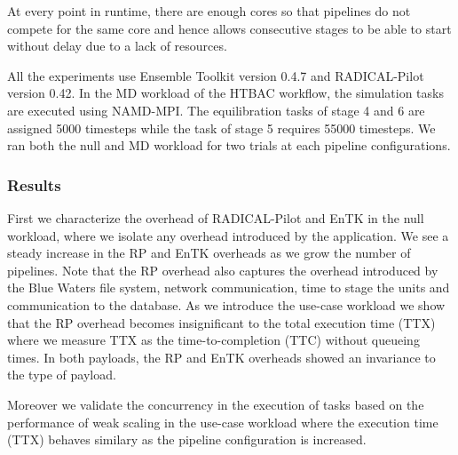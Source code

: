 At every point in runtime, there are enough cores so that pipelines do not compete for the same core and hence allows consecutive stages to be able to start without delay due to a lack of resources. 



All the experiments use Ensemble Toolkit version 0.4.7 and RADICAL-Pilot
version 0.42. In the MD workload of the HTBAC workflow, the simulation tasks
are executed using NAMD-MPI\@. The equilibration %
tasks of stage 4 and 6 are assigned 5000 timesteps while the task of stage 5
requires 55000 timesteps. We ran both the null and MD workload for two trials at each pipeline configurations. 

\subsubsection{Results}

First we characterize the overhead of RADICAL-Pilot and EnTK in the null workload, where we isolate any overhead introduced by the application. We see a steady increase in the RP and EnTK overheads as we grow the number of pipelines. Note that the RP overhead also captures the overhead introduced by the Blue Waters file system, network communication, time to stage the units and communication to the database. As we introduce the use-case workload we show that the RP overhead becomes insignificant to the total execution time (TTX) where we measure TTX as the time-to-completion (TTC) without queueing times. In both payloads, the RP and EnTK overheads showed an invariance to the type of payload. 

Moreover we validate the concurrency in the execution of tasks based on the performance of weak scaling in the use-case workload where the execution time (TTX) behaves similary as the pipeline configuration is increased. 

